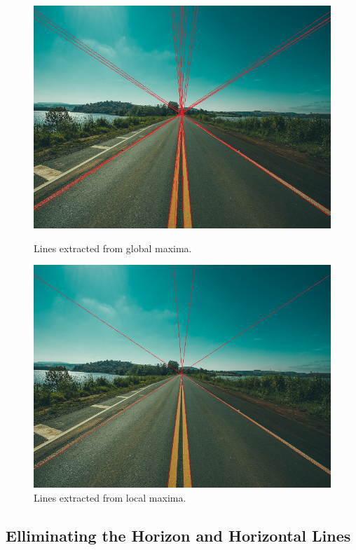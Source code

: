 \documentclass[epsfig,10pt,fullpage]{article}
\begin{document}
\begin{figure}[h]
\centering
\begin{minipage}[b]{0.47\textwidth}
	\includegraphics[width=\textwidth]{figures/fig_road_lines_global_maxima.png}
	\caption{Lines extracted from global maxima.}
	\label{fig:global_maxima}
\end{minipage}
\hfill
\begin{minipage}[b]{0.47\textwidth}
	\includegraphics[width=\textwidth]{figures/fig_road_lines_local_maxima.png}
	\caption{Lines extracted from local maxima.}
	\label{fig:local_maxima}
\end{minipage}
\end{figure}

\subsection*{Elliminating the Horizon and Horizontal Lines}
\end{document}

